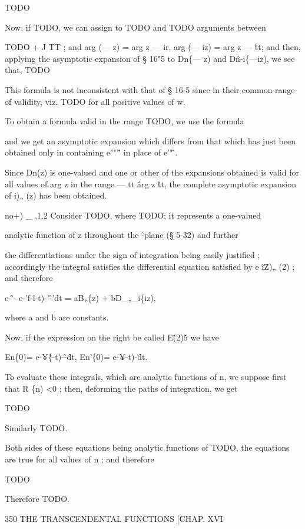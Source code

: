 TODO

Now, if TODO, we can assign to TODO and TODO arguments between

TODO + J TT ; and arg (— z) = arg z — ir, arg (— iz) = arg z — \^tt;
and then, applying the asymptotic expansion of § 16"5 to Dn\{— z) and
D\^n-i\{—iz), we see that, TODO

%
%

This formula is not inconsistent with that of § 16-5 since in their
common range of validity, viz. TODO for all positive values of w.

To obtain a formula valid in the range TODO, we use the formula

and we get an asymptotic expansion which differs from that which has
just been obtained only in containing e""'\^' in place of e'"\^'.

Since Dn(z) is one-valued and one or other of the expansions obtained
is valid for all values of arg z in the range — tt \^ arg z \^tt, the
complete asymptotic expansion of i)„ (z) has been obtained.


no+) \_ ,1,2 Consider TODO, where TODO; it represents a one-valued

analytic function of z throughout the \^-plane (§ 5-32) and further

the differentiations under the sign of integration being easily
justified ; accordingly the integral satisfies the differential
equation satisfied by e \~ i\^ Z)„ (2) ; and therefore

e-\^'- e-'f-\^i-t)-'\^-'dt = aB„\{z) + bD\_„\_i\{iz),

where a and b are constants.

Now, if the expression on the right be called E\^ (2)5 we have

En\{0)= e-¥\^\{-t)-\^-\^dt, En'\{0)= e-¥-t)-\^dt.

To evaluate these integrals, which are analytic functions of n, we
suppose first that R \{n) <0 ; then, deforming the paths of
integration, we get

TODO

Similarly TODO.

Both sides of these equations being analytic functions of TODO, the
equations are true for all values of n ; and therefore

TODO

Therefore TODO.



350 THE TRANSCENDENTAL FUNCTIONS [CHAP. XVI


